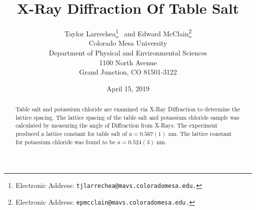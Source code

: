 \documentclass[twocolumn]{article}
\title{\textbf{X-Ray Diffraction Of Table Salt}}
\author{Taylor Larrechea\footnote{Electronic Address: \texttt{tjlarrechea@mavs.coloradomesa.edu.}} \ and Edward McClain\footnote{Electronic Address: \texttt{epmcclain@mavs.coloradomesa.edu.}} \\
    Colorado Mesa University \\
    Department of Physical and Environmental Sciences \\
    1100 North Avenue \\
    Grand Junction, CO 81501-3122}
\date{April 15, 2019}
\begin{document}
\maketitle
\begin{abstract}
Table salt and potassium chloride are examined via X-Ray Diffraction to determine the lattice spacing. The lattice spacing of the table salt and potassium chloride sample was calculated by measuring the angle of Diffraction from X-Rays. The experiment produced a lattice constant for table salt of $a=0.567(1)$ nm. The lattice constant for potassium chloride was found to be $a=0.524(3)$ nm. 
\end{abstract}
\end{document}

